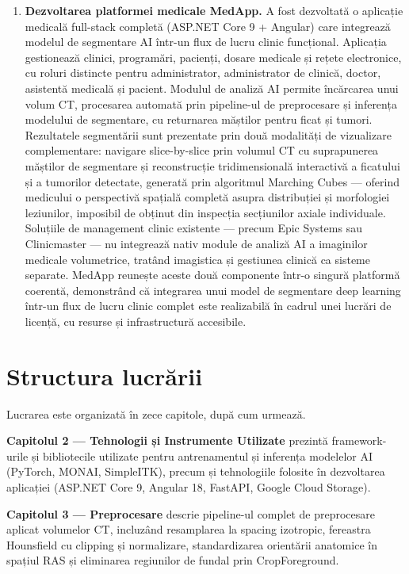 \documentclass[12pt, a4paper]{report}
\begin{document}
\begin{enumerate}
\item \textbf{Dezvoltarea platformei medicale MedApp.}
    A fost dezvoltată o aplicație medicală full-stack completă
    (ASP.NET Core 9 + Angular) care integrează modelul de
    segmentare AI într-un flux de lucru clinic funcțional.
    Aplicația gestionează clinici, programări, pacienți, dosare
    medicale și rețete electronice, cu roluri distincte pentru
    administrator, administrator de clinică, doctor, asistentă
    medicală și pacient. Modulul de analiză AI permite încărcarea
    unui volum CT, procesarea automată prin pipeline-ul de
    preprocesare și inferența modelului de segmentare, cu
    returnarea măștilor pentru ficat și tumori. Rezultatele
    segmentării sunt prezentate prin două modalități de
    vizualizare complementare: navigare slice-by-slice prin
    volumul CT cu suprapunerea măștilor de segmentare și
    reconstrucție tridimensională interactivă a ficatului și
    a tumorilor detectate, generată prin algoritmul Marching
    Cubes — oferind medicului o perspectivă spațială completă
    asupra distribuției și morfologiei leziunilor, imposibil
    de obținut din inspecția secțiunilor axiale individuale.
    Soluțiile de management clinic existente — precum Epic
    Systems sau Clinicmaster — nu integrează nativ module de
    analiză AI a imaginilor medicale volumetrice, tratând
    imagistica și gestiunea clinică ca sisteme separate.
    MedApp reunește aceste două componente într-o singură
    platformă coerentă, demonstrând că integrarea unui model
    de segmentare deep learning într-un flux de lucru clinic
    complet este realizabilă în cadrul unei lucrări de licență,
    cu resurse și infrastructură accesibile.
\end{enumerate}
\section{Structura lucrării}

Lucrarea este organizată în zece capitole, după cum urmează.

\textbf{Capitolul 2 — Tehnologii și Instrumente Utilizate} prezintă
framework-urile și bibliotecile utilizate pentru antrenamentul și
inferența modelelor AI (PyTorch, MONAI, SimpleITK), precum și
tehnologiile folosite în dezvoltarea aplicației (ASP.NET Core 9,
Angular 18, FastAPI, Google Cloud Storage).

\textbf{Capitolul 3 — Preprocesare} descrie pipeline-ul complet
de preprocesare aplicat volumelor CT, incluzând resamplarea la
spacing izotropic, fereastra Hounsfield cu clipping și normalizare,
standardizarea orientării anatomice în spațiul RAS și eliminarea
regiunilor de fundal prin CropForeground.
\end{document}
